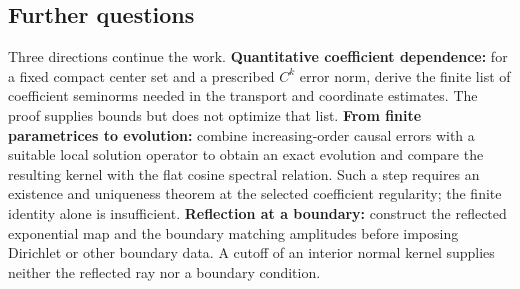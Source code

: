 \documentclass[
  11pt,
]{article}
\begin{document}
\subsection{Further questions}\label{further-questions}

Three directions continue the work. \textbf{Quantitative coefficient
dependence:} for a fixed compact center set and a prescribed \(C^k\)
error norm, derive the finite list of coefficient seminorms needed in
the transport and coordinate estimates. The proof supplies bounds but
does not optimize that list. \textbf{From finite parametrices to
evolution:} combine increasing-order causal errors with a suitable local
solution operator to obtain an exact evolution and compare the resulting
kernel with the flat cosine spectral relation. Such a step requires an
existence and uniqueness theorem at the selected coefficient regularity;
the finite identity alone is insufficient. \textbf{Reflection at a
boundary:} construct the reflected exponential map and the boundary
matching amplitudes before imposing Dirichlet or other boundary data. A
cutoff of an interior normal kernel supplies neither the reflected ray
nor a boundary condition.
\end{document}
